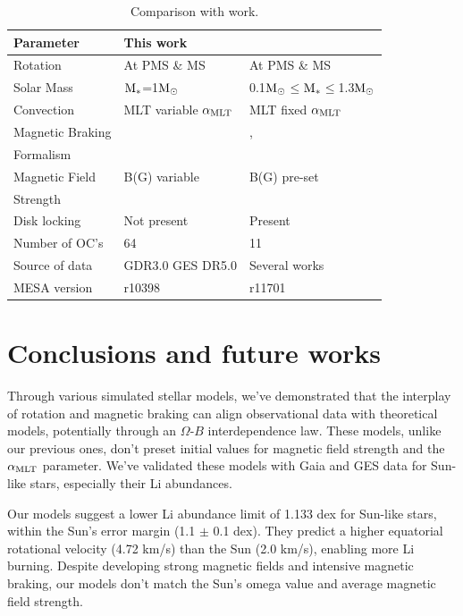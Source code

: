 \documentclass[fleqn,usenatbib]{mnras}
\begin{document}
\begin{table}
	\centering
    \begin{threeparttable}
	\begin{tabular}{lll} 
		\hline
		Parameter & This work & \citet{Gossage2021}\\
		\hline
            
		Rotation & At PMS \& MS & At PMS \& MS\\
  		Solar Mass & $\mathrm{M}_*$=1$\mathrm{M}_\odot$ & 0.1$\mathrm{M}_\odot$$\le$$\mathrm{M}_*$$\le$1.3$\mathrm{M}_\odot$ \\
		Convection & MLT variable $\alpha_{{\rm MLT}}$ & MLT fixed $\alpha_{{\rm MLT}}$\\
		Magnetic Braking & \citet{Gallet2013} & \citet{Matt2015}, \\ Formalism & & \citet{Garraffo2018}\\
		Magnetic Field & B(G) variable & B(G) pre-set\\ Strength & & \\
            Disk locking & Not present & Present\\
            Number of OC's & 64 & 11 \\
            Source of data & GDR3.0 GES DR5.0 & Several works \\
            MESA version & r10398 & r11701\\
		\hline
	\end{tabular}
    \end{threeparttable}
	\caption{Comparison with \citet{Gossage2021} work.}\label{tab:gassage_vs_navarro}    
\end{table}


\section{Conclusions and future works} \label{sec_conclusions}
Through various simulated stellar models, we've demonstrated that the interplay of rotation and magnetic braking can align observational data with theoretical models, potentially through an $\Omega$-$B$ interdependence law. These models, unlike our previous ones, don't preset initial values for magnetic field strength and the $\alpha_{\mathrm{MLT}}$ parameter. We've validated these models with Gaia and GES data for Sun-like stars, especially their Li abundances.\par

Our models suggest a lower Li abundance limit of 1.133 dex for Sun-like stars, within the Sun's error margin (1.1 $\pm$ 0.1 dex). They predict a higher equatorial rotational velocity (4.72 km/s) than the Sun (2.0 km/s), enabling more Li burning. Despite developing strong magnetic fields and intensive magnetic braking, our models don't match the Sun's omega value and average magnetic field strength.\par
\end{document}
